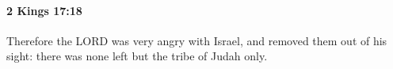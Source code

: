 
		\paragraph{2 Kings 17:18} %
			\label{2KINGS-17-18}

			Therefore the LORD was very angry with Israel, and removed them out of his sight: there was none left but the tribe of Judah only.


